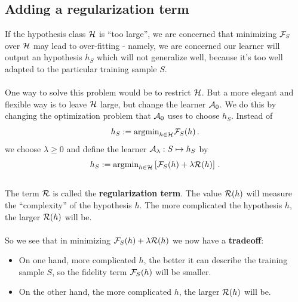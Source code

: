 \subsection{Adding a regularization term}

If the hypothesis class $\mathcal{H}$ is ``too large'', we are concerned that minimizing
$\mathcal{F}_S$
over $\mathcal{H}$ may lead to over-fitting - namely, we are concerned our learner will
output 
 an hypothesis $h_S$ which will
not generalize well, because it's too well adapted to the particular training sample $S$.
\\~\\
One way to solve this problem would be to restrict $\mathcal{H}$. 
But a more elegant and flexible way is to leave $\mathcal{H}$ large, but change the learner
$\mathcal{A}_0$. We do this by changing the optimization problem that $\mathcal{A}_0$ uses to choose
$h_S$. Instead of 
\[
  h_S := \text{argmin}_{h\in\mathcal{H}} \mathcal{F}_S(h)\,.
\]
we choose $\lambda\geq 0$ and define the learner $\mathcal{A}_\lambda:S\mapsto h_S$ by
\[
  h_S := \text{argmin}_{h\in\mathcal{H}}\left[ \mathcal{F}_S(h)+  \lambda \mathcal{R}(h)\right] \,.
\]
~\\
The term $\mathcal{R}$ is called the {\bf regularization term}. The value $\mathcal{R}(h)$ will measure the
``complexity'' of the hypothesis $h$. The more complicated the hypothesis $h$,
the larger $\mathcal{R}(h)$ will be. 
\\~\\
So we see that in minimizing $ \mathcal{F}_S(h)+ \lambda \mathcal{R}(h)$ we now have a
{\bf tradeoff}:
\begin{itemize}
  \item On one hand, more complicated $h$, the better it can describe the
    training sample $S$, so the fidelity term $\mathcal{F}_S(h)$ will be smaller.
  \item On the other hand, the more complicated $h$, the larger $\mathcal{R}(h)$ will
    be. 
\end{itemize}

